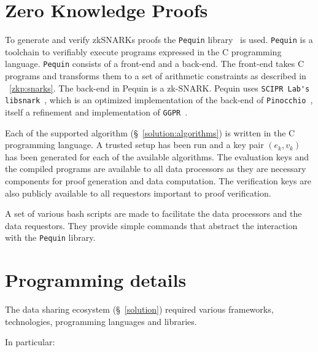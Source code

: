 \section{Zero Knowledge Proofs}
\label{implemenation:zkp}

To generate and verify zkSNARKs proofs the \verb|Pequin| library~\cite{pequin} is used. \verb|Pequin| is a toolchain to verifiably execute programs expressed in the C programming language. \verb|Pequin| consists of a front-end and a back-end. The front-end takes C programs and transforms them to a set of arithmetic constraints as described in ~\ref{zkp:snarks}. The back-end in Pequin is a zk-SNARK. Pequin uses \verb|SCIPR Lab's libsnark|~\cite{libsnark}, which is an optimized implementation of the back-end of \verb|Pinocchio|~\cite{pinocchio-nearly-practical-verifiable-computation}, itself a refinement and implementation of \verb|GGPR|~\cite{ggpr}.

Each of the supported algorithm (§~\ref{solution:algorithms}) is written in the C programming language. A trusted setup has been run and a key pair $(e_k, v_k)$ has been generated for each of the available algorithms. The evaluation keys and the compiled programs are available to all data processors as they are necessary components for proof generation and data computation. The verification keys are also publicly available to all requestors important to proof verification.

A set of various bash scripts are made to facilitate the data processors and the data requestors. They provide simple commands that abstract the interaction with the \verb|Pequin| library.

\section{Programming details}
\label{implemenation:details}

The data sharing ecosystem (§~\ref{solution}) required various frameworks, technologies, programming languages and libraries.

In particular:

